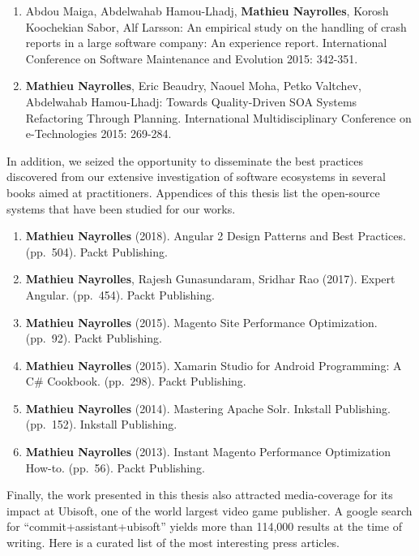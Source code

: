 \documentclass[12pt]{report}
\begin{document}
\begin{enumerate}
\def\labelenumi{\arabic{enumi}.}
\setcounter{enumi}{6}
\item
  Abdou Maiga, Abdelwahab Hamou-Lhadj, \textbf{Mathieu Nayrolles},
  Korosh Koochekian Sabor, Alf Larsson: An empirical study on the
  handling of crash reports in a large software company: An experience
  report. International Conference on Software Maintenance and Evolution
  2015: 342-351.
\item
  \textbf{Mathieu Nayrolles}, Eric Beaudry, Naouel Moha, Petko Valtchev,
  Abdelwahab Hamou-Lhadj: Towards Quality-Driven SOA Systems Refactoring
  Through Planning. International Multidisciplinary Conference on
  e-Technologies 2015: 269-284.
\end{enumerate}

In addition, we seized the opportunity to disseminate the best practices
discovered from our extensive investigation of software ecosystems in
several books aimed at practitioners. Appendices of this thesis list the
open-source systems that have been studied for our works.

\begin{enumerate}
\def\labelenumi{\arabic{enumi}.}
\setcounter{enumi}{8}
\item
  \textbf{Mathieu Nayrolles} (2018). Angular 2 Design Patterns and Best
  Practices. (pp.~504). Packt Publishing.
\item
  \textbf{Mathieu Nayrolles}, Rajesh Gunasundaram, Sridhar Rao (2017).
  Expert Angular. (pp.~454). Packt Publishing.
\item
  \textbf{Mathieu Nayrolles} (2015). Magento Site Performance
  Optimization. (pp.~92). Packt Publishing.
\item
  \textbf{Mathieu Nayrolles} (2015). Xamarin Studio for Android
  Programming: A C\# Cookbook. (pp.~298). Packt Publishing.
\item
  \textbf{Mathieu Nayrolles} (2014). Mastering Apache Solr. Inkstall
  Publishing. (pp.~152). Inkstall Publishing.
\item
  \textbf{Mathieu Nayrolles} (2013). Instant Magento Performance
  Optimization How-to. (pp.~56). Packt Publishing.
\end{enumerate}

Finally, the work presented in this thesis also attracted media-coverage
for its impact at Ubisoft, one of the world largest video game
publisher. A google search for ``commit+assistant+ubisoft'' yields more
than 114,000 results at the time of writing. Here is a curated list of
the most interesting press articles.
\end{document}
